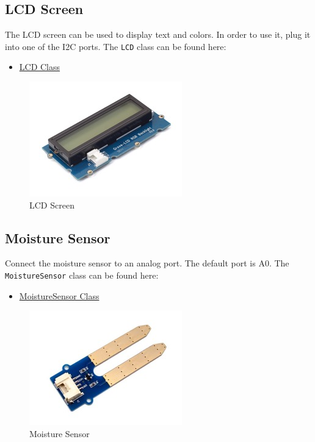 \subsection{LCD Screen}\label{lcd-screen}

The LCD screen can be used to display text and colors. In order to use
it, plug it into one of the I2C ports. The \texttt{LCD} class can be
found here:

\begin{itemize}
\tightlist
\item
  \href{https://github.com/cloudmesh/cloudmesh.pi/blob/master/cloudmesh/pi/lcd.py}{LCD
  Class}
\end{itemize}

\begin{figure}
\centering
\includegraphics{../images/grovepi/lcd.jpg}
\caption{LCD Screen}
\end{figure}

\subsection{Moisture Sensor}\label{moisture-sensor}

Connect the moisture sensor to an analog port. The default port is A0.
The \texttt{MoistureSensor} class can be found here:

\begin{itemize}
\tightlist
\item
  \href{https://github.com/cloudmesh/cloudmesh.pi/blob/master/cloudmesh/pi/moisture.py}{MoistureSensor
  Class}
\end{itemize}

\begin{figure}
\centering
\includegraphics{../images/grovepi/moisture.jpg}
\caption{Moisture Sensor}
\end{figure}


